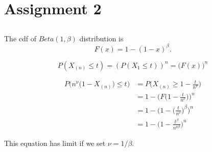 \clearpage
\section{Assignment 2}

\subsection{} %

The cdf of $Beta(1,\beta)$ distribution is
\begin{equation}
    F(x) = 1 - (1-x)^\beta.
\end{equation}

\begin{equation}
    P(X_{(n)}\le t) = (P(X_1\le t))^n = \big(F(x)\big)^n
\end{equation}

\begin{align}
    P\big(n^\nu\big(1-X_{(n)}\big)\le t\big)
        &= P\bigg(X_{(n)}\ge 1-\frac{t}{n^\nu}\bigg) \\
        &= 1 - \bigg(F\bigg(1-\frac{t}{n^\nu}\bigg)\bigg)^n \\
        &= 1 - \bigg(1 - \bigg(\frac{t}{n^\nu}\bigg)^\beta\bigg)^n \\
        &= 1 - \bigg(1 - \frac{t^\beta}{n^{\nu \beta}}\bigg)^n
\end{align}

This equation has limit if we set $\nu=1/\beta$.
